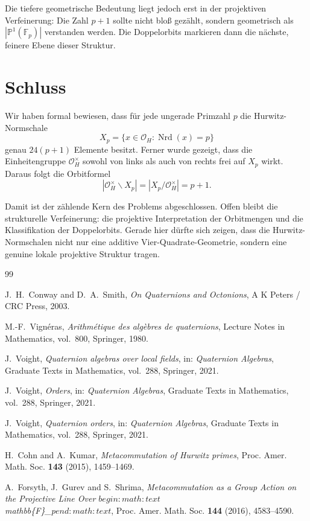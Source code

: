 \documentclass[12pt,a4paper]{article}
\theoremstyle{plain}
\theoremstyle{definition}
\theoremstyle{remark}
\newcommand{\OH}{\mathcal O_H}
\newcommand{\Fp}{\mathbb F_p}
\newcommand{\PP}{\mathbb P}
\newcommand{\nrd}{\operatorname{Nrd}}
\begin{document}
	Die tiefere geometrische Bedeutung liegt jedoch erst in der projektiven Verfeinerung: Die Zahl \(p+1\) sollte nicht bloß gezählt, sondern geometrisch als \(|\PP^1(\Fp)|\) verstanden werden. Die Doppelorbits markieren dann die nächste, feinere Ebene dieser Struktur.
	
	\section{Schluss}
	
	Wir haben formal bewiesen, dass für jede ungerade Primzahl \(p\) die Hurwitz-Normschale
	\[
	X_p=\{x\in\OH:\nrd(x)=p\}
	\]
	genau \(24(p+1)\) Elemente besitzt. Ferner wurde gezeigt, dass die Einheitengruppe \(\OH^\times\) sowohl von links als auch von rechts frei auf \(X_p\) wirkt. Daraus folgt die Orbitformel
	\[
	|\OH^\times\backslash X_p|
	=
	|X_p/\OH^\times|
	=
	p+1.
	\]
	
	Damit ist der zählende Kern des Problems abgeschlossen. Offen bleibt die strukturelle Verfeinerung: die projektive Interpretation der Orbitmengen und die Klassifikation der Doppelorbits. Gerade hier dürfte sich zeigen, dass die Hurwitz-Normschalen nicht nur eine additive Vier-Quadrate-Geometrie, sondern eine genuine lokale projektive Struktur tragen.
	
	\begin{thebibliography}{99}
		
		J.~H.~Conway and D.~A.~Smith,
		\emph{On Quaternions and Octonions},
		A K Peters / CRC Press, 2003.
		
		M.-F.~Vign\'eras,
		\emph{Arithm\'etique des alg\`ebres de quaternions},
		Lecture Notes in Mathematics, vol.~800,
		Springer, 1980.
		
		J.~Voight,
		\emph{Quaternion algebras over local fields},
		in: \emph{Quaternion Algebras},
		Graduate Texts in Mathematics, vol.~288,
		Springer, 2021.
		
		J.~Voight,
		\emph{Orders},
		in: \emph{Quaternion Algebras},
		Graduate Texts in Mathematics, vol.~288,
		Springer, 2021.
		
		J.~Voight,
		\emph{Quaternion orders},
		in: \emph{Quaternion Algebras},
		Graduate Texts in Mathematics, vol.~288,
		Springer, 2021.
		
		H.~Cohn and A.~Kumar,
		\emph{Metacommutation of Hurwitz primes},
		Proc. Amer. Math. Soc. \textbf{143} (2015), 1459--1469.
		
		A.~Forsyth, J.~Gurev and S.~Shrima,
		\emph{Metacommutation as a Group Action on the Projective Line Over $begin:math:text$\\mathbb\{F\}\_p$end:math:text$},
		Proc. Amer. Math. Soc. \textbf{144} (2016), 4583--4590.
		
	\end{thebibliography}
	
\end{document}
